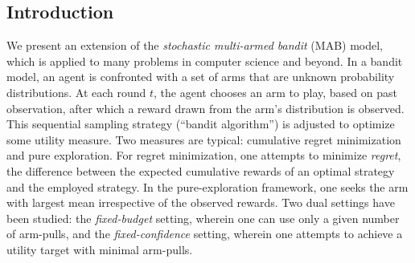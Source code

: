 

%
%
\subsection{Introduction}\label{sec-intro}

We present an extension of the \emph{stochastic multi-armed
bandit} (MAB) model, which is applied to
many problems in computer science and beyond.  In a bandit model,
an agent
is confronted with a set of arms
that are unknown probability distributions.
At each round $t$, the agent chooses an arm to play,
based on past observation, after which a reward
drawn from the arm's distribution is observed. This sequential
sampling strategy (``bandit algorithm'') is adjusted to
optimize some utility measure.
Two measures are typical: cumulative regret
minimization and pure exploration.
For regret minimization, one attempts
 to minimize \emph{regret}, the difference between
the expected cumulative rewards of an
optimal strategy and the employed strategy.
In the pure-exploration framework, one seeks
the arm with largest mean irrespective of the observed rewards.
Two dual settings have been studied: the \emph{fixed-budget}
setting, wherein one
can use
only a given number of arm-pulls,
and the \emph{fixed-confidence} setting, wherein one
attempts to achieve a utility target with minimal arm-pulls.


